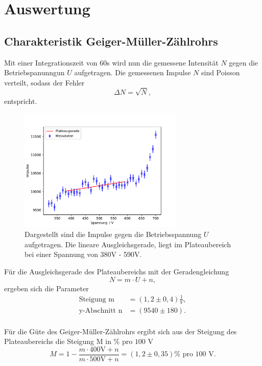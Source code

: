 \newpage
\section{Auswertung}
\subsection{Charakteristik Geiger-Müller-Zählrohrs}
Mit einer Integrationszeit von $60$s wird nun die gemessene Intensität
$N$ gegen die Betriebspanunngun $U$ aufgetragen.
Die gemessenen Impulse $N$ sind Poisson verteilt, sodass der Fehler
\begin{equation*}
    \Delta N = \sqrt{N},
\end{equation*}
entspricht.
\begin{figure}[H]
    \centering
    \includegraphics[width=0.7\textwidth]{input/p_charakteristik.pdf}
    \caption{Dargestellt sind die Impulse gegen die Betriebsspannung $U$ aufgetragen.
    Die lineare Ausgleichsgerade, liegt im Plateaubereich bei einer Spannung von
    380V - 590V.}
    \label{fig:charakter}
\end{figure}
\label{sec:Auswertung}
Für die Ausgleichsgerade des Plateaubereichs mit der Geradengleichung
\begin{equation}
    N=m\cdot U+n,
\end{equation}
ergeben sich die Parameter
\begin{align*}
    \text{Steigung m} &= (1,2\pm0,4)\frac{1}{\si{V}},\\
    \text{y-Abschnitt n}&= (9540\pm180).\\
\end{align*}

Für die Güte des Geiger-Müller-Zählrohrs ergibt sich aus der Steigung des
Plateaubereichs die Steigung M in \% pro $100$ V
\begin{equation*}
    M=1-\frac{m\cdot 400\text{V}+n}{m\cdot 500\text{V}+n}=(1,2\pm 0,35)\% \text{ pro } 100 \text{ V}.
\end{equation*}

